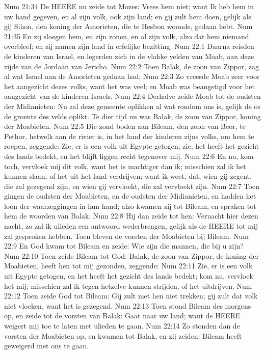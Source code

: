 Num 21:34  De HEERE nu zeide tot Mozes: Vrees hem niet; want Ik heb hem in uw hand gegeven, en al zijn volk, ook zijn land; en gij zult hem doen, gelijk als gij Sihon, den koning der Amorieten, die te Hesbon woonde, gedaan hebt.
Num 21:35  En zij sloegen hem, en zijn zonen, en al zijn volk, alzo dat hem niemand overbleef; en zij namen zijn land in erfelijke bezitting.
Num 22:1  Daarna reisden de kinderen van Israel, en legerden zich in de vlakke velden van Moab, aan deze zijde van de Jordaan van Jericho.
Num 22:2  Toen Balak, de zoon van Zippor, zag al wat Israel aan de Amorieten gedaan had;
Num 22:3  Zo vreesde Moab zeer voor het aangezicht dezes volks, want het was veel; en Moab was beangstigd voor het aangezicht van de kinderen Israels.
Num 22:4  Derhalve zeide Moab tot de oudsten der Midianieten: Nu zal deze gemeente oplikken al wat rondom ons is, gelijk de os de groente des velds oplikt. Te dier tijd nu was Balak, de zoon van Zippor, koning der Moabieten.
Num 22:5  Die zond boden aan Bileam, den zoon van Beor, te Pethor, hetwelk aan de rivier is, in het land der kinderen zijns volks, om hem te roepen, zeggende: Zie, er is een volk uit Egypte getogen; zie, het heeft het gezicht des lands bedekt, en het blijft liggen recht tegenover mij.
Num 22:6  En nu, kom toch, vervloek mij dit volk, want het is machtiger dan ik; misschien zal ik het kunnen slaan, of het uit het land verdrijven; want ik weet, dat, wien gij zegent, die zal gezegend zijn, en wien gij vervloekt, die zal vervloekt zijn.
Num 22:7  Toen gingen de oudsten der Moabieten, en de oudsten der Midianieten, en hadden het loon der waarzeggingen in hun hand; alzo kwamen zij tot Bileam, en spraken tot hem de woorden van Balak.
Num 22:8  Hij dan zeide tot hen: Vernacht hier dezen nacht, zo zal ik ulieden een antwoord wederbrengen, gelijk als de HEERE tot mij zal gesproken hebben. Toen bleven de vorsten der Moabieten bij Bileam.
Num 22:9  En God kwam tot Bileam en zeide: Wie zijn die mannen, die bij u zijn?
Num 22:10  Toen zeide Bileam tot God: Balak, de zoon van Zippor, de koning der Moabieten, heeft hen tot mij gezonden, zeggende:
Num 22:11  Zie, er is een volk uit Egypte getogen, en het heeft het gezicht des lands bedekt; kom nu, vervloek het mij; misschien zal ik tegen hetzelve kunnen strijden, of het uitdrijven.
Num 22:12  Toen zeide God tot Bileam: Gij zult met hen niet trekken; gij zult dat volk niet vloeken, want het is gezegend.
Num 22:13  Toen stond Bileam des morgens op, en zeide tot de vorsten van Balak: Gaat naar uw land; want de HEERE weigert mij toe te laten met ulieden te gaan.
Num 22:14  Zo stonden dan de vorsten der Moabieten op, en kwamen tot Balak, en zij zeiden: Bileam heeft geweigerd met ons te gaan.
